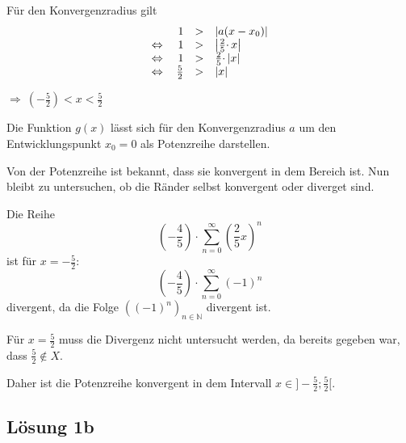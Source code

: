 Für den Konvergenzradius gilt 
\begin{equation*}
	\begin{array}{ l r c l }
		& 1 &  > & | a( x-x_{0})| \\
		\Leftrightarrow  & \ 1 &  > & \left| \frac{2}{5} \cdotp x\right| \\
		\Leftrightarrow  & 1 &  > & \frac{2}{5} \cdotp |x|\\
		\Leftrightarrow  & \frac{5}{2} &  > & |x|
	\end{array}
\end{equation*}


$\displaystyle \Rightarrow \ \left( -\frac{5}{2}\right) < x< \frac{5}{2}$ 



Die Funktion $\displaystyle g( x)$ lässt sich für den Konvergenzradius $\displaystyle a$ um den Entwicklungspunkt $\displaystyle x_{0} =0$ als Potenzreihe darstellen.



Von der Potenzreihe ist bekannt, dass sie konvergent in dem Bereich ist. Nun bleibt zu untersuchen, ob die Ränder selbst konvergent oder diverget sind.



Die Reihe
\begin{equation*}
	\left( -\frac{4}{5}\right) \cdotp \sum _{n=0}^{\infty }\left(\frac{2}{5} x\right)^{n}
\end{equation*}
ist für $\displaystyle x= -\frac{5}{2}$:
\begin{equation*}
	\left( -\frac{4}{5}\right) \cdotp \sum _{n=0}^{\infty }( -1)^{n}
\end{equation*}
divergent, da die Folge $\displaystyle \left(( -1)^{n}\right)_{n\in \mathbb{N}}$ divergent ist.



Für $\displaystyle x=\frac{5}{2}$ muss die Divergenz nicht untersucht werden, da bereits gegeben war, dass $\displaystyle \frac{5}{2} \notin X$.

Daher ist die Potenzreihe konvergent in dem Intervall $\displaystyle x\in ] -\frac{5}{2} ;\frac{5}{2}[$. 



\subsection{Lösung 1b}

